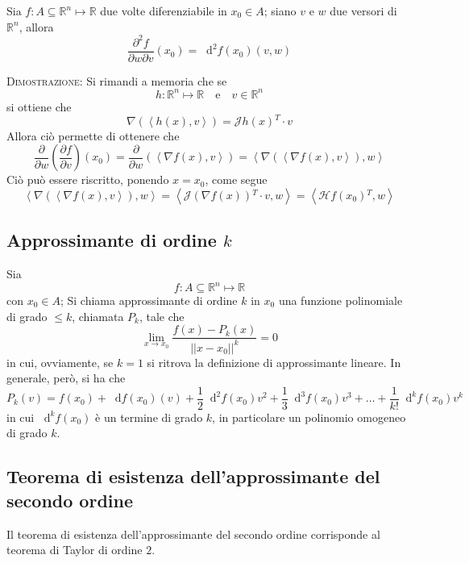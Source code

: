 \documentclass[a4paper]{extarticle}
\newcommand*\dif{\mathop{}\!\mathrm{d}}
\begin{document}
\vspace{2em}
\noindent
Sia $f : A \subseteq \mathbb{R}^n \longmapsto \mathbb{R}$ due volte diferenziabile in $x_0 \in A$; siano $v$ e $w$ due versori di $\mathbb{R}^n$, allora
\[\dfrac{\partial^2 f}{\partial w \partial v}(x_0) = \dif^2 f(x_0) (v,w)\]

\vspace{2em}
\noindent
\normalfont \normalsize
\textsc{Dimostrazione}: Si rimandi a memoria che se
\[h : \mathbb{R}^n \longmapsto \mathbb{R} \hspace{1em} \text{e} \hspace{1em} v \in \mathbb{R}^n\]
si ottiene che
\[\nabla \left(\left< h(x), v \right>\right) = \mathcal{J} h(x){^T} \cdot v\]
Allora ciò permette di ottenere che
\[\dfrac{\partial}{\partial w} \left(\dfrac{\partial f}{\partial v}\right) (x_0) = \dfrac{\partial}{\partial w} \left(\left<\nabla f(x), v \right>\right) = \left<\nabla \left(\left< \nabla f(x), v \right>\right), w\right>\]
Ciò può essere riscritto, ponendo $x=x_0$, come segue
\[\left<\nabla \left(\left< \nabla f(x), v \right>\right), w\right> = \left<\mathcal{J}(\nabla f(x)){^T} \cdot v, w\right> = \left<\mathcal{H} f(x_0){^T}, w \right>\]

\vspace{1em}
\noindent
\subsection{Approssimante di ordine $k$}
Sia
\[f : A \subseteq \mathbb{R}^n \longmapsto \mathbb{R}\]
con $x_0 \in A$; Si chiama approssimante di ordine $k$ in $x_0$ una funzione polinomiale di grado $\leq k$, chiamata $P_k$, tale che
\[\lim_{x \to x_0} \dfrac{f(x) - P_k(x)}{\vert \vert x-x_0 \vert \vert^k} = 0\]
in cui, ovviamente, se $k=1$ si ritrova la definizione di approssimante lineare. In generale, però, si ha che
\[P_k(v) = f(x_0) + \dif f(x_0)(v) + \dfrac{1}{2} \dif^2 f(x_0) v^2 + \dfrac{1}{3} \dif^3 f(x_0)v^3 + \dots + \dfrac{1}{k!} \dif^k f(x_0) v^k\]
in cui $\dif^k f(x_0)$ è un termine di grado $k$, in particolare un polinomio omogeneo di grado $k$.

\vspace{1em}
\noindent
\subsection{Teorema di esistenza dell'approssimante del secondo ordine}
Il teorema di esistenza dell'approssimante del secondo ordine corrisponde al teorema di Taylor di ordine $2$.
\end{document}

